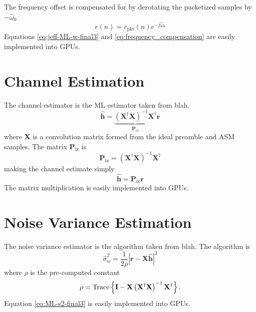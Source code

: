 The frequency offset is compensated for by derotating the packetized samples by $-\hat{\omega}_0$
\begin{equation}
	r(n) = r_\text{pkt}(n) e^{-j\hat{\omega}_0}
	\label{eq:frequency_compensation}
\end{equation}
Equations \eqref{eq:jeff-ML-w-final3} and \eqref{eq:frequency_compensation} are easily implemented into GPUs. 

\section{Channel Estimation}
\label{sec:channel_estimation}
The channel estimator is the ML estimator taken from blah.
\begin{equation}
\hat{\mathbf{h}} = \underbrace{ \left( \mathbf{X}^\dag\mathbf{X} \right)^{-1} \mathbf{X}^\dag}_{\mathbf{P}_{ix}}\mathbf{r}
\end{equation}
where $\mathbf{X}$ is a convolution matrix formed from the ideal preamble and ASM samples.
The matrix $\mathbf{P}_\text{ix}$ is
\begin{equation}
\mathbf{P}_\text{ix} = \left( \mathbf{X}^\dag\mathbf{X} \right)^{-1} \mathbf{X}^\dag
\end{equation}
making the channel estimate simply
\begin{equation}
\hat{\mathbf{h}} = \mathbf{P}_\text{ix} \mathbf{r}
\end{equation}
The matrix multiplication is easily implemented into GPUs.


\section{Noise Variance Estimation}
\label{sec:noise_variance_estimation}
The noise variance estimator is the algorithm taken from blah.
The algorithm is
\begin{equation}
	\hat{\sigma}_w^2 = \frac{1}{2\rho} \left| \mathbf{r}-\mathbf{X}\hat{\mathbf{h}}\right|^2
	\label{eq:ML-s2-final3}
\end{equation}
where $\rho$ is the pre-computed constant
\begin{equation}
	\rho = {\rm Trace} \left\{ \mathbf{I} -  \mathbf{X}\left(\mathbf{X}^\dag\mathbf{X}\right)^{-1}\mathbf{X}^\dag \right\}.
\end{equation}
Equation \eqref{eq:ML-s2-final3} is easily implemented into GPUs.
	

